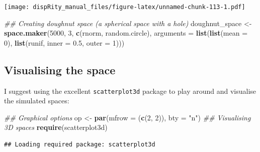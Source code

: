 \documentclass[]{book}
\newenvironment{Shaded}{\begin{snugshade}}{\end{snugshade}}
\newcommand{\CommentTok}[1]{\textcolor[rgb]{0.56,0.35,0.01}{\textit{#1}}}
\newcommand{\DataTypeTok}[1]{\textcolor[rgb]{0.13,0.29,0.53}{#1}}
\newcommand{\DecValTok}[1]{\textcolor[rgb]{0.00,0.00,0.81}{#1}}
\newcommand{\FloatTok}[1]{\textcolor[rgb]{0.00,0.00,0.81}{#1}}
\newcommand{\KeywordTok}[1]{\textcolor[rgb]{0.13,0.29,0.53}{\textbf{#1}}}
\newcommand{\NormalTok}[1]{#1}
\newcommand{\StringTok}[1]{\textcolor[rgb]{0.31,0.60,0.02}{#1}}
\begin{document}
\texttt{[image: dispRity\_manual\_files/figure-latex/unnamed-chunk-113-1.pdf]}

\begin{Shaded}
\begin{Highlighting}[]
\CommentTok{## Creating doughnut space (a spherical space with a hole)}
\NormalTok{doughnut_space <-}\StringTok{ }\KeywordTok{space.maker}\NormalTok{(}\DecValTok{5000}\NormalTok{, }\DecValTok{3}\NormalTok{, }\KeywordTok{c}\NormalTok{(rnorm, random.circle),}
     \DataTypeTok{arguments =} \KeywordTok{list}\NormalTok{(}\KeywordTok{list}\NormalTok{(}\DataTypeTok{mean =} \DecValTok{0}\NormalTok{),}
                      \KeywordTok{list}\NormalTok{(runif, }\DataTypeTok{inner =} \FloatTok{0.5}\NormalTok{, }\DataTypeTok{outer =} \DecValTok{1}\NormalTok{)))}
\end{Highlighting}
\end{Shaded}

\hypertarget{visualising-the-space}{%
\subsection{Visualising the space}\label{visualising-the-space}}

I suggest using the excellent \texttt{scatterplot3d} package to play around and visualise the simulated spaces:

\begin{Shaded}
\begin{Highlighting}[]
\CommentTok{## Graphical options}
\NormalTok{op <-}\StringTok{ }\KeywordTok{par}\NormalTok{(}\DataTypeTok{mfrow =}\NormalTok{ (}\KeywordTok{c}\NormalTok{(}\DecValTok{2}\NormalTok{, }\DecValTok{2}\NormalTok{)), }\DataTypeTok{bty =} \StringTok{"n"}\NormalTok{)}
\CommentTok{## Visualising 3D spaces}
\KeywordTok{require}\NormalTok{(scatterplot3d)}
\end{Highlighting}
\end{Shaded}

\begin{verbatim}
## Loading required package: scatterplot3d
\end{verbatim}
\end{document}
